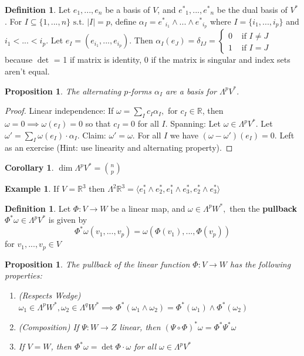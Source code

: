 \documentclass[10pt]{article}
\theoremstyle{plain}
\newtheorem{corollary}[thm]{Corollary}
\newtheorem{prop}[thm]{Proposition}
\theoremstyle{definition}
\newtheorem{defn}[thm]{Definition} %
\newtheorem{exmp}[thm]{Example} %
\newcommand{\st}{\text{ s.t. }}
\newcommand{\myif}{\text{ if }}
\newcommand{\Real}{\mathbb{R}}
\newcommand{\setform}[2]{\Lambda^{#1} {#2}}
\newcommand{\allthevs}[2]{v_{#1},...,v_{#2}}
\newcommand{\allthe}[3]{{#1}_{#2},...,{#1}_{#3}}
\newcommand{\wedgge}{\omega_1\wedge\omega_2}
\newcommand{\allthewedge}[3]{{#1}_{#2}\wedge...\wedge{#1}_{#3}}
\begin{document}
\begin{defn}
Let $\allthe{e}{1}{n}$ be a basis of $V$, and $\allthe{e^*}{1}{n}$ be the dual basis of $V^*$. For $I \subseteq \{1,...,n\} \st \vert I \vert = p$, define $\alpha_I = \allthewedge{e^*}{i_1}{i_p}$ where $I = \{\allthe{i}{1}{p}\}$ and $i_1 < ... < i_p$. Let $e_I = (\allthe{e}{i_1}{i_p})$. Then $\alpha_I(e_J) = \delta_{IJ} = \begin{cases} 
    0 &\myif I \neq J \\
    1 &\myif  I = J
\end{cases} $   because $\det$ = 1 if matrix is identity, 0 if the matrix is singular and index sets aren't equal.
\end{defn}
\begin{prop}
The alternating $p$-forms $\alpha_I$ are a basis for $\setform{p}{V^*}.$
\end{prop}
\begin{proof}
Linear independence: If $ \omega = \sum\limits_{I} c_I \alpha_I,$ for $c_I \in \Real$, then $\omega = 0 \implies \omega(e_I) = 0$ so that $ c_I = 0$ for all $I$.
Spanning: Let $\omega \in \setform{p}{V^*}$. Let $\omega'= \sum\limits_{I} \omega(e_I)\cdot \alpha_I$. Claim: $\omega' = \omega$. For all $I$ we have $(\omega-\omega')(e_I) =0$. Left as an exercise (Hint: use linearity and alternating property).
\end{proof}
\begin{corollary}
$\dim \setform{p}{V^*} = {\binom{n}{p}}$
\end{corollary}
\begin{exmp}
If $V = \Real^3$ then $\setform{2}{\Real^3} = \langle e^*_1 \wedge e_2^*,e^*_1 \wedge e_3^*,e^*_2 \wedge e_3^*\rangle$
\end{exmp}
\begin{defn}
Let $\Phi : V \to W$ be a linear map, and $\omega \in \setform{p}{W^*},$ then the \textbf{pullback} $\Phi^*\omega \in \setform{p}{V^*}$ is given by
$$\Phi^* \omega(\allthevs{1}{p}) = \omega(\Phi(v_1),...,\Phi(v_p)) $$
for $\allthevs{1}{p} \in V$
\end{defn}
\begin{prop}
The pullback of the linear function $\Phi:V\to W$ has the following properties:
\begin{enumerate}
    \item (Respects Wedge) $\omega_1 \in\setform{p}{W^*}, \omega_2\in\setform{q}{W^*} \implies \Phi^*(\wedgge) = \Phi^*(\omega_1)\wedge \Phi^*(\omega_2)$
    \item (Composition) If $\Psi:W\to Z$ linear, then $(\Psi\circ\Phi)^*\omega = \Phi^*\Psi^*\omega$
    \item If $V = W$, then $\Phi^*\omega = \det\Phi\cdot\omega$ for all $\omega \in \setform{p}{V^*}$
\end{enumerate}
\end{prop}
\end{document}
